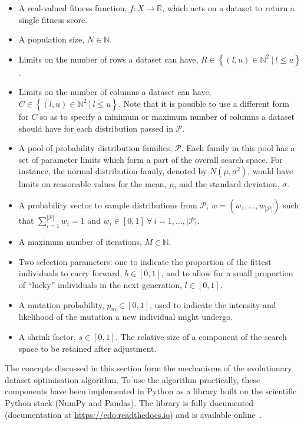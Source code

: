 \begin{itemize}
    \item A real-valued fitness function, \(f: X \to \mathbb{R}\), which acts on
        a dataset to return a single fitness score.
    \item A population size, \(N \in \mathbb{N}\).
    \item Limits on the number of rows a dataset can have,
        \(R \in \left\{(l, u) \in \mathbb{N}^2~|~l \leq u\right\}\).
    \item Limits on the number of columns a dataset can have,
        \(C \in \left\{(l, u) \in \mathbb{N}^2~|~l \leq u\right\}\). Note that
        it is possible to use a different form for \(C\) so as to specify a
        minimum or maximum number of columns a dataset should have for each
        distribution passed in \(\mathcal{P}\).
    \item A pool of probability distribution families, \(\mathcal{P}\). Each
        family in this pool has a set of parameter limits which form a part of
        the overall search space. For instance, the normal distribution family,
        denoted by \(N(\mu, \sigma^2)\), would have limits on reasonable values
        for the mean, \(\mu\), and the standard deviation, \(\sigma\).
    \item A probability vector to sample distributions from \(\mathcal{P}\),
        \(w = \left(w_1, \ldots, w_{|\mathcal{P}|}\right)\) such that
        \(\sum_{i=1}^{|\mathcal{P}|} w_i = 1\) and
        \(w_i \in [0, 1] \ \forall~i = 1, \ldots, |\mathcal{P}|\).
    \item A maximum number of iterations, \(M \in \mathbb{N}\).
    \item Two selection parameters: one to indicate the proportion of the 
        fittest individuals to carry forward, \(b \in [0, 1]\), and to allow for
        a small proportion of ``lucky'' individuals in the next generation,
        \(l \in [0, 1]\).
    \item A mutation probability, \(p_m \in [0, 1]\), used to indicate the
        intensity and likelihood of the mutation a new individual might undergo.
    \item A shrink factor, \(s \in [0, 1]\). The relative size of a component of
        the search space to be retained after adjustment.
\end{itemize}

The concepts discussed in this section form the mechanisms of the evolutionary
dataset optimisation algorithm. To use the algorithm practically, these
components have been implemented in Python as a library built on the scientific
Python stack (NumPy and Pandas). The library is fully documented (documentation
at \url{https://edo.readthedocs.io}) and is available online~\cite{edo-project}.


